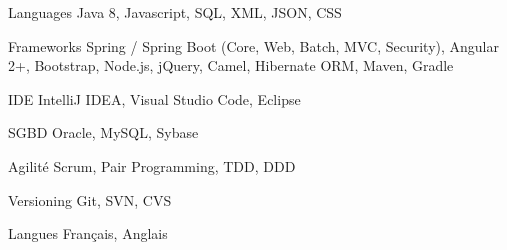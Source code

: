 \begin{cvskills}

  \cvskill
    {Languages} %
    {Java 8, Javascript, SQL, XML, JSON, CSS} %

  \cvskill
    {Frameworks} %
    {Spring / Spring Boot (Core, Web, Batch, MVC, Security), Angular 2+, Bootstrap, Node.js, jQuery, Camel, Hibernate ORM, Maven, Gradle} %
    
  \cvskill
    {IDE} %
    {IntelliJ IDEA, Visual Studio Code, Eclipse} %
    
  \cvskill
    {SGBD} %
    {Oracle, MySQL, Sybase} %
    
  \cvskill
    {Agilité} %
    {Scrum, Pair Programming, TDD, DDD} %
       
  \cvskill
    {Versioning} %
    {Git, SVN, CVS} %
    
  \cvskill
    {Langues} %
    {Français, Anglais} %


\end{cvskills}